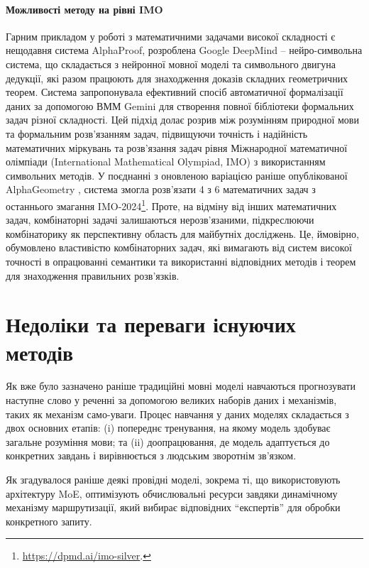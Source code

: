\paragraph{Можливості методу на рівні IMO}
Гарним прикладом у роботі з математичними задачами високої складності є нещодавня система AlphaProof, розроблена Google DeepMind -- нейро-символьна система, що складається з нейронної мовної моделі та символьного двигуна дедукції, які разом працюють для знаходження доказів складних геометричних теорем. Система запропонувала ефективний спосіб автоматичної формалізації даних за допомогою ВММ Gemini для створення повної бібліотеки формальних задач різної складності. Цей підхід долає розрив між розумінням природної мови та формальним розв'язанням задач, підвищуючи точність і надійність математичних міркувань та розв'язання задач рівня Міжнародної математичної олімпіади (International Mathematical Olympiad, IMO) з використанням символьних методів. У поєднанні з оновленою варіацією раніше опублікованої AlphaGeometry \cite{Trinh2024SolvingOG}, система змогла розв'язати 4 з 6 математичних задач з останнього змагання IMO-2024\footnote{\url{https://dpmd.ai/imo-silver}.}. Проте, на відміну від інших математичних задач, комбінаторні задачі залишаються нерозв'язаними, підкреслюючи комбінаторику як перспективну область для майбутніх досліджень. Це, ймовірно, обумовлено властивістю комбінаторних задач, які вимагають від систем високої точності в опрацюванні семантики та використанні відповідних методів і теорем для знаходження правильних розв'язків.

\section{Недоліки та переваги існуючих методів}

Як вже було зазначено раніше традиційні мовні моделі навчаються прогнозувати наступне слово у реченні за допомогою великих наборів даних і механізмів, таких як механізм само-уваги. Процес навчання у даних моделях складається з двох основних етапів: (i) попереднє тренування, на якому модель здобуває загальне розуміння мови; та (ii) доопрацювання, де модель адаптується до конкретних завдань і вирівнюється з людським зворотнім зв'язком.

Як згадувалося раніше деякі провідні моделі, зокрема ті, що використовують архітектуру MoE, оптимізують обчислювальні ресурси завдяки динамічному механізму маршрутизації, який вибирає відповідних ``експертів'' для обробки конкретного запиту.

